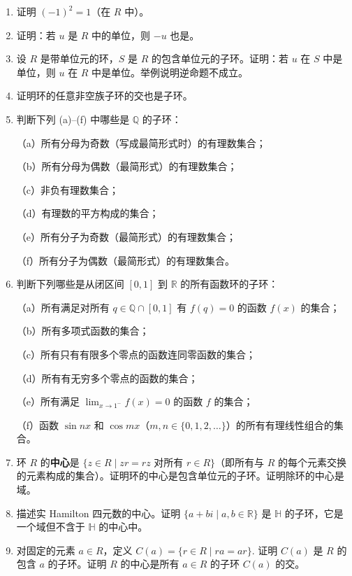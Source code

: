 \begin{enumerate}
\item 证明 \((-1)^2 = 1\)（在 \(R\) 中）。

\item 证明：若 \(u\) 是 \(R\) 中的单位，则 \(-u\) 也是。

\item 设 \(R\) 是带单位元的环，\(S\) 是 \(R\) 的包含单位元的子环。证明：若 \(u\) 在 \(S\) 中是单位，则 \(u\) 在 \(R\) 中是单位。举例说明逆命题不成立。

\item 证明环的任意非空族子环的交也是子环。

\item 判断下列 (a)–(f) 中哪些是 \(\mathbb{Q}\) 的子环：

（a）所有分母为奇数（写成最简形式时）的有理数集合；

（b）所有分母为偶数（最简形式）的有理数集合；

（c）非负有理数集合；

（d）有理数的平方构成的集合；

（e）所有分子为奇数（最简形式）的有理数集合；

（f）所有分子为偶数（最简形式）的有理数集合。

\item 判断下列哪些是从闭区间 \([0,1]\) 到 \(\mathbb{R}\) 的所有函数环的子环：

（a）所有满足对所有 \(q \in \mathbb{Q} \cap [0,1]\) 有 \(f(q) = 0\) 的函数 \(f(x)\) 的集合；

（b）所有多项式函数的集合；

（c）所有只有有限多个零点的函数连同零函数的集合；

（d）所有有无穷多个零点的函数的集合；

（e）所有满足 \(\lim_{x \to 1^-} f(x) = 0\) 的函数 \(f\) 的集合；

（f）函数 \(\sin nx\) 和 \(\cos mx\)（\(m, n \in \{0, 1, 2, \ldots\}\)）的所有有理线性组合的集合。

\item 环 \(R\) 的\textbf{中心}是 \(\{z \in R \mid zr = rz \text{ 对所有 } r \in R\}\)（即所有与 \(R\) 的每个元素交换的元素构成的集合）。证明环的中心是包含单位元的子环。证明除环的中心是域。

\item 描述实 Hamilton 四元数的中心。证明 \(\{a + bi \mid a, b \in \mathbb{R}\}\) 是 \(\mathbb{H}\) 的子环，它是一个域但不含于 \(\mathbb{H}\) 的中心中。

\item 对固定的元素 \(a \in R\)，定义 \(C(a) = \{r \in R \mid ra = ar\}\). 证明 \(C(a)\) 是 \(R\) 的包含 \(a\) 的子环。证明 \(R\) 的中心是所有 \(a \in R\) 的子环 \(C(a)\) 的交。


\end{enumerate}
